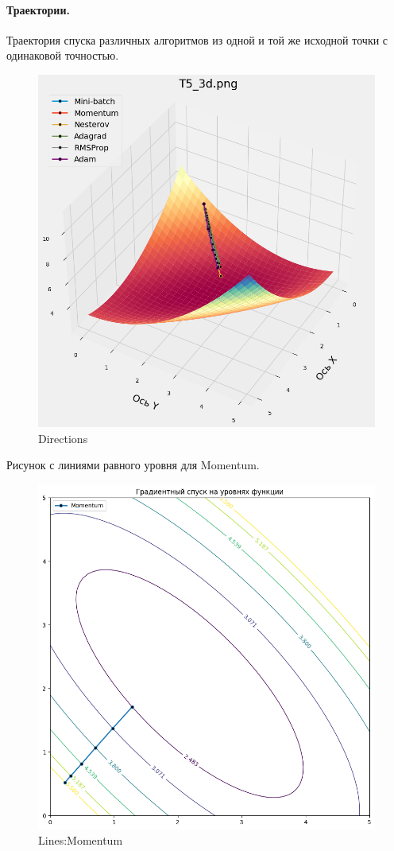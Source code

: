 \documentclass[12pt, a4paper, oneside, final]{article}
\begin{document}
	\paragraph{Траектории.}
	Траектория спуска различных алгоритмов из одной и той же исходной точки с одинаковой точностью.
	\begin{figure}[H]
		\centering
		\includegraphics[scale = 0.6]{Image/T5_DIRECTIONS.png}
		\caption*{Directions}
	\end{figure}
	Рисунок с линиями равного уровня для Momentum.
	\begin{figure}[H]
		\centering
		\includegraphics[scale = 0.6]{Image/T5_LINES_MOMENTUM.png}
		\caption*{Lines:Momentum}
	\end{figure}
\end{document}
